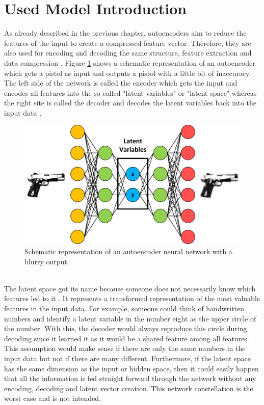 \documentclass[MGS,Master,english]{twbook}%
\begin{document}
\section{Used Model Introduction}
As already described in the previous chapter, autoencoders aim to reduce the features of the input to create a compressed feature vector. Therefore, they are also used for encoding and decoding the same structure, feature extraction and data compression \cite{ml::book::nnProgrammingTF}. Figure \ref{fig::autoencoder} shows a schematic representation of an autoencoder which gets a pistol as input and outputs a pistol with a little bit of inaccuracy. The left side of the network is called the encoder which gets the input and encodes all features into the so-called "latent variables" or "latent space" whereas the right site is called the decoder and decodes the latent variables back into the input data \cite{ml::book::nnProgrammingTF}. 
\begin{figure}[!htbp]
	\centering
	\includegraphics[width=0.9\linewidth]{PICs/NNs/autoencoder}
	\caption{Schematic representation of an autoencoder neural network with a blurry output.} \label{fig::autoencoder}
\end{figure}\\
The latent space got its name because someone does not necessarily know which features led to it \cite{ml::vae::tutorial}. It represents a transformed representation of the most valuable features in the input data. For example, someone could think of handwritten numbers and identify a latent variable in the number eight as the upper circle of the number. With this, the decoder would always reproduce this circle during decoding since it learned it as it would be a shared feature among all features. This assumption would make sense if there are only the same numbers in the input data but not if there are many different. Furthermore, if the latent space has the same dimension as the input or hidden space, then it could easily happen that all the information is fed straight forward through the network without any encoding, decoding and latent vector creation. This network constellation is the worst case and is not intended.\\
\end{document}

